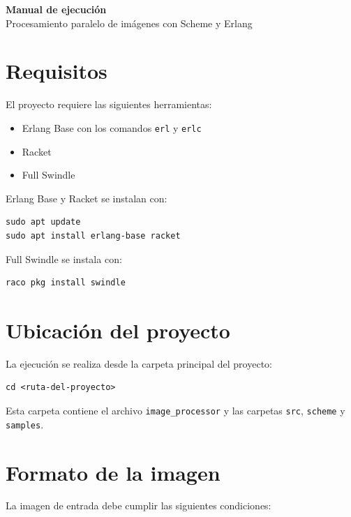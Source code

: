 \documentclass[11pt]{article}
\begin{document}
\begin{center}
    {\LARGE\textbf{Manual de ejecución}}\\
    \vspace{0.3cm}
    {\large Procesamiento paralelo de imágenes con Scheme y Erlang}
\end{center}

\section*{Requisitos}

El proyecto requiere las siguientes herramientas:

\begin{itemize}
    \item Erlang Base con los comandos \texttt{erl} y \texttt{erlc}
    \item Racket
    \item Full Swindle
\end{itemize}

Erlang Base y Racket se instalan con:

\begin{lstlisting}
sudo apt update
sudo apt install erlang-base racket
\end{lstlisting}

Full Swindle se instala con:

\begin{lstlisting}
raco pkg install swindle
\end{lstlisting}

\section*{Ubicación del proyecto}

La ejecución se realiza desde la carpeta principal del proyecto:

\begin{lstlisting}
cd <ruta-del-proyecto>
\end{lstlisting}

Esta carpeta contiene el archivo \texttt{image\_processor} y las carpetas
\texttt{src}, \texttt{scheme} y \texttt{samples}.

\section*{Formato de la imagen}

La imagen de entrada debe cumplir las siguientes condiciones:
\end{document}
